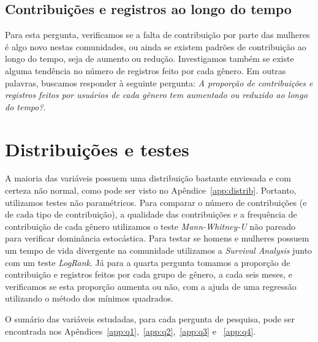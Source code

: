 
\subsection{Contribuições e registros ao longo do tempo}

Para esta pergunta, verificamos se a falta de contribuição por parte das mulheres é algo novo nestas comunidades, ou ainda se existem padrões de contribuição ao longo do tempo, seja de aumento ou redução. Investigamos também se existe alguma tendência no número de registros feito por cada gênero. Em outras palavras, buscamos responder à seguinte pergunta: \textit{A proporção de contribuições e registros feitos por usuários de cada gênero tem aumentado ou reduzido ao longo do tempo?}. 


\section{Distribuições e testes}

A maioria das variáveis possuem uma distribuição bastante enviesada e com certeza não normal, como pode ser visto no Apêndice~\ref{app:distrib}. Portanto, utilizamos testes não paramétricos. Para comparar o número de contribuições (e de cada tipo de contribuição), a qualidade das contribuições e a frequência de contribuição de cada gênero utilizamos o teste \emph{Mann-Whitney-U} não pareado para verificar dominância estocástica. Para testar se homens e mulheres possuem um tempo de vida divergente na comunidade utilizamos a \textit{Survival Analysis} junto com um teste \emph{LogRank}. Já para a quarta pergunta tomamos a proporção de contribuição e registros feitos por cada grupo de gênero, a cada seis meses, e verificamos se esta proporção aumenta ou não, com a ajuda de uma regressão utilizando o método dos mínimos quadrados.


O sumário das variáveis estudadas, para cada pergunta de pesquisa, pode ser encontrada nos Apêndices~\ref{app:q1},~\ref{app:q2},~\ref{app:q3} e ~\ref{app:q4}.


